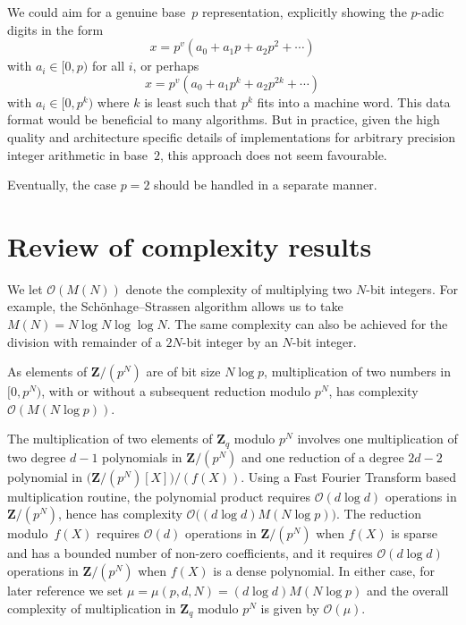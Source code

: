 \begin{rem}
We could aim for a genuine base~$p$ representation, explicitly showing 
the $p$-adic digits in the form 
\begin{equation}
x = p^v (a_0 + a_1 p + a_2 p^2 + \dotsb) 
\end{equation}
with $a_i \in [0,p)$ for all $i$, or perhaps 
\begin{equation}
x = p^v (a_0 + a_1 p^k + a_2 p^{2k} + \dotsb)
\end{equation}
with $a_i \in [0,p^k)$ where $k$ is least such that $p^{k}$ fits into 
a machine word.
This data format would be beneficial to many algorithms.  But in practice, 
given the high quality and architecture specific details of implementations 
for arbitrary precision integer arithmetic in base~$2$, this approach does 
not seem favourable.
\end{rem}

\begin{rem}
Eventually, the case $p = 2$ should be handled in a separate manner.
\end{rem}

\section{Review of complexity results}

We let $\mathcal{O}(M(N))$ denote the complexity of multiplying two 
$N$-bit integers.  For example, the Sch\"onhage--Strassen algorithm 
allows us to take $M(N) = N \log N \log \log N$.  The same 
complexity can also be achieved for the division with remainder of 
a $2N$-bit integer by an $N$-bit integer.

As elements of $\mathbf{Z} / (p^N)$ are of bit size $N \log p$, 
multiplication of two numbers in $[0, p^N)$, with or without a subsequent 
reduction modulo $p^N$, has complexity $\mathcal{O}(M(N \log p))$.

The multiplication of two elements of $\mathbf{Z}_q$ modulo $p^N$ 
involves one multiplication of two degree $d-1$ polynomials in 
$\mathbf{Z}/(p^N)$ and one reduction of a degree $2d - 2$ polynomial 
in $\bigl( \mathbf{Z}/(p^N)[X] \bigr) / (f(X))$.   Using a Fast Fourier 
Transform based multiplication routine, the polynomial product requires 
$\mathcal{O}(d \log d)$ operations in $\mathbf{Z}/(p^N)$, hence has 
complexity $\mathcal{O}\bigl((d \log d) M(N \log p)\bigr)$.  The reduction 
modulo~$f(X)$ requires $\mathcal{O}(d)$ operations in $\mathbf{Z}/(p^N)$ 
when $f(X)$ is sparse and has a bounded number of non-zero coefficients, 
and it requires $\mathcal{O}(d \log d)$ operations in $\mathbf{Z}/(p^N)$ when 
$f(X)$ is a dense polynomial.  In either case, for later reference we set 
$\mu = \mu(p,d,N) = (d \log d) M(N \log p)$ and the overall complexity of 
multiplication in $\mathbf{Z}_q$ modulo $p^N$ is given by 
$\mathcal{O}(\mu)$.

